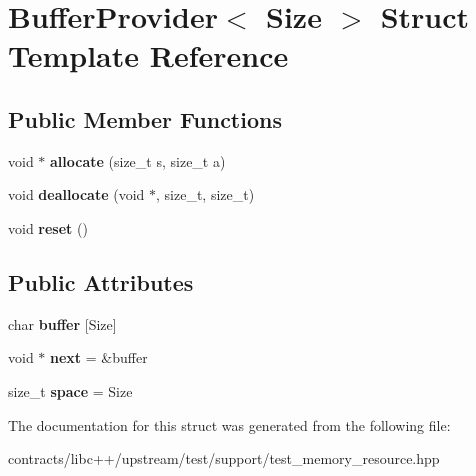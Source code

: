 \hypertarget{struct_buffer_provider}{}\section{Buffer\+Provider$<$ Size $>$ Struct Template Reference}
\label{struct_buffer_provider}
\subsection*{Public Member Functions}
\begin{DoxyCompactItemize}
\item 
\mbox{\label{struct_buffer_provider_abfd37170331622eb4c15c9e4f8408c11}} 
void $\ast$ {\bfseries allocate} (size\+\_\+t s, size\+\_\+t a)
\item 
\mbox{\label{struct_buffer_provider_a60d5d346ef37d39a762653bed70fc5cd}} 
void {\bfseries deallocate} (void $\ast$, size\+\_\+t, size\+\_\+t)
\item 
\mbox{\label{struct_buffer_provider_a3b40ec29fca7ccf5c9c734918c8efdd1}} 
void {\bfseries reset} ()
\end{DoxyCompactItemize}
\subsection*{Public Attributes}
\begin{DoxyCompactItemize}
\item 
\mbox{\label{struct_buffer_provider_a8e57fc37d5d07e1af564489a4678e074}} 
char {\bfseries buffer} \mbox{[}Size\mbox{]}
\item 
\mbox{\label{struct_buffer_provider_adc8b960bfada25726c87a5501e09484f}} 
void $\ast$ {\bfseries next} = \&buffer
\item 
\mbox{\label{struct_buffer_provider_af9066c046ba0eb48513bd1fd094bd6c2}} 
size\+\_\+t {\bfseries space} = Size
\end{DoxyCompactItemize}


The documentation for this struct was generated from the following file\+:\begin{DoxyCompactItemize}
\item 
contracts/libc++/upstream/test/support/test\+\_\+memory\+\_\+resource.\+hpp\end{DoxyCompactItemize}
